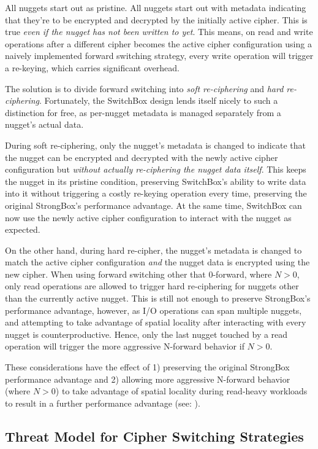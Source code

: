 All nuggets start out as pristine. All nuggets start out with metadata
indicating that they're to be encrypted and decrypted by the initially active
cipher. This is true \emph{even if the nugget has not been written to yet}. This
means, on read and write operations after a different cipher becomes the active
cipher configuration using a naively implemented forward switching strategy,
every write operation will trigger a re-keying, which carries significant
overhead.

The solution is to divide forward switching into \emph{soft re-ciphering} and
\emph{hard re-ciphering}. Fortunately, the SwitchBox design lends itself nicely
to such a distinction for free, as per-nugget metadata is managed separately
from a nugget's actual data.

During soft re-ciphering, only the nugget's metadata is changed to indicate that
the nugget can be encrypted and decrypted with the newly active cipher
configuration but \emph{without actually re-ciphering the nugget data itself}.
This keeps the nugget in its pristine condition, preserving SwitchBox's ability
to write data into it without triggering a costly re-keying operation every
time, preserving the original StrongBox's performance advantage. At the same
time, SwitchBox can now use the newly active cipher configuration to interact
with the nugget as expected.

On the other hand, during hard re-cipher, the nugget's metadata is changed to
match the active cipher configuration \emph{and} the nugget data is encrypted
using the new cipher. When using forward switching other that 0-forward,
 where $N > 0$, only read operations are allowed to trigger hard
re-ciphering for nuggets other than the currently active nugget. This is still
not enough to preserve StrongBox's performance advantage, however, as I/O
operations can span multiple nuggets, and attempting to take advantage of
spatial locality after interacting with every nugget is counterproductive.
Hence, only the last nugget touched by a read operation will trigger the more
aggressive N-forward behavior if $N > 0$.

These considerations have the effect of 1) preserving the original StrongBox
performance advantage and 2) allowing more aggressive N-forward behavior (where
$N > 0$) to take advantage of spatial locality during read-heavy workloads to
result in a further performance advantage (see: ).

\subsection{Threat Model for Cipher Switching Strategies}

